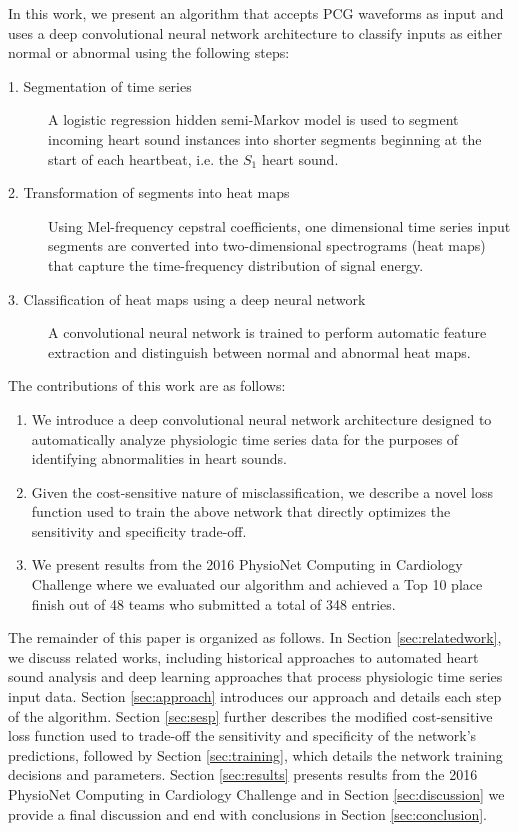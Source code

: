 \documentclass{article}
\begin{document}
In this work, we present an algorithm that accepts PCG waveforms as input and uses a deep convolutional neural network architecture to classify inputs as either normal or abnormal using the following steps:

\begin{description}
\item[1. Segmentation of time series] A logistic regression hidden semi-Markov model is used to segment incoming heart sound instances into shorter segments beginning at the start of each heartbeat, i.e. the $S_1$ heart sound.
\item[2. Transformation of segments into heat maps] Using Mel-frequency cepstral coefficients, one dimensional time series input segments are converted into two-dimensional spectrograms (heat maps) that capture the time-frequency distribution of signal energy.
\item[3. Classification of heat maps using a deep neural network] A convolutional neural network is trained to perform automatic feature extraction and distinguish between normal and abnormal heat maps.
\end{description}

The contributions of this work are as follows:

\begin{enumerate}
\item We introduce a deep convolutional neural network architecture designed to automatically analyze physiologic time series data for the purposes of identifying abnormalities in heart sounds.
\item Given the cost-sensitive nature of misclassification, we describe a novel loss function used to train the above network that directly optimizes the sensitivity and specificity trade-off.
\item We present results from the 2016 PhysioNet Computing in Cardiology Challenge where we evaluated our algorithm and achieved a Top 10 place finish out of 48 teams who submitted a total of 348 entries.
\end{enumerate}

The remainder of this paper is organized as follows. In Section \ref{sec:relatedwork}, we discuss related works, including historical approaches to automated heart sound analysis and deep learning approaches that process physiologic time series input data. Section \ref{sec:approach} introduces our approach and details each step of the algorithm. Section \ref{sec:sesp} further describes the modified cost-sensitive loss function used to trade-off the sensitivity and specificity of the network's predictions, followed by Section \ref{sec:training}, which details the network training decisions and parameters. Section \ref{sec:results} presents results from the 2016 PhysioNet Computing in Cardiology Challenge and in Section \ref{sec:discussion} we provide a final discussion and end with conclusions in Section \ref{sec:conclusion}.
\end{document}

